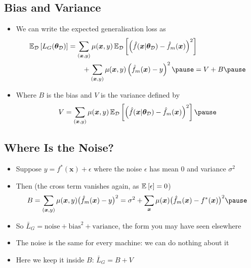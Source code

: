 \begin{slide}
\section[-2]{Bias and Variance}

\begin{PauseHighLight}
  \begin{itemize}
  \item We can write the expected generalisation loss as
    \begin{align*}
      \av[\mathcal{D}]{ L_G(\bm{\theta}_{\mathcal{D}}) }
      &= \sum_{(\bm{x},y)} \mu(\bm{x},y)\, 
      \av[\mathcal{D}]{ \left(\hat{f}(\bm{x}\vert \bm{\theta}_{\mathcal{D}}) -
      \hat{f}_m(\bm{x})\right)^2 } \\
        & \quad \quad +
          \sum_{(\bm{x},y)} \mu(\bm{x},y) \left( \hat{f}_m(\bm{x})
      - y \right)^2 \pause
        = V + B\pause
    \end{align*}
  \item Where $B$ is the bias and $V$ is the variance defined by
    \begin{align*}
      V = \sum_{(\bm{x},y)} \mu(\bm{x},y)\,
      \av[\mathcal{D}]{ \left(\hat{f}(\bm{x}\vert \bm{\theta}_{\mathcal{D}}) -
      \hat{f}_m(\bm{x})\right)^2 }\pause 
    \end{align*}
  \end{itemize}
\end{PauseHighLight}

\end{slide}


\begin{slide}
\section[-1]{Where Is the Noise?}

\begin{PauseHighLight}
  \begin{itemize}
  \item Suppose $y = f^*(\bm{x}) + \epsilon$ where the noise $\epsilon$ has
    mean 0 and variance $\sigma^2$\pause
  \item Then (the cross term vanishes again, as $\mathbb{E}_{}\left[ \epsilon \right]=0$)
    \begin{align*}
      B = \sum_{(\bm{x},y)} \mu(\bm{x},y)\bigl(\hat{f}_m(\bm{x}) - y\bigr)^2
      = \sigma^2 + \sum_{\bm{x}} \mu(\bm{x})\bigl(\hat{f}_m(\bm{x}) -
      f^*(\bm{x})\bigr)^2\pause
    \end{align*}
  \item So $\bar{L}_G = \text{noise} + \text{bias}^2 + \text{variance}$,
    the form you may have seen elsewhere\pause
  \item The noise is the same for every machine: we can do nothing
    about it\pause
  \item Here we keep it inside $B$: $\bar{L}_G = B + V$\pause
  \end{itemize}
\end{PauseHighLight}

\end{slide}

